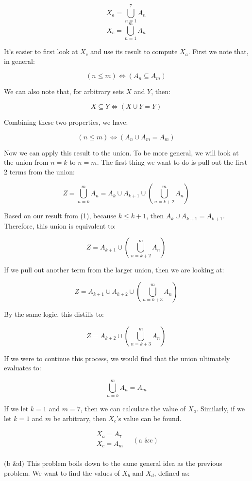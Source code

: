 \documentclass{article}
\newcommand{\subproblem}[1]{$\boxed{\text{(#1)}}$}
\newcommand{\subsolution}[2]{\boxed{#2\quad(\text{#1})}}
\begin{document}
\begin{multicols*}{2}
\[
X_a=\bigcup\limits_{n=1}^7 A_n
\] \[
X_c=\bigcup\limits_{n=1}^m A_n
\]

It's easier to first look at $X_c$ and use its result to compute
$X_a$. First we note that, in general:

\[
(n \le m)\Leftrightarrow(A_n\subseteq A_m)
\]

We can also note that, for arbitrary sets $X$ and $Y$, then:

\[
X\subseteq Y \Leftrightarrow (X\cup Y=Y)
\]

Combining these two properties, we have:

\[\tag{1}
(n\le m)\Leftrightarrow(A_n\cup A_m=A_m)
\]

Now we can apply this result to the union. To be more general, we will
look at the union from $n=k$ to $n=m$. The first thing we want to do
is pull out the first 2 terms from the union:

\[
Z = \bigcup\limits_{n=k}^m A_n = A_k\cup A_{k+1}\cup\left(\bigcup\limits_{n=k+2}^m A_n\right)
\]

Based on our result from (1), because $k\le{}k+1$, then
$A_k\cup{}A_{k+1}=A_{k+1}$. Therefore, this union is equivalent to:

\[
Z = A_{k+1}\cup\left(\bigcup\limits_{n=k+2}^m A_n\right)
\]

If we pull out another term from the larger union, then we are looking
at:

\[
Z = A_{k+1}\cup{}A_{k+2}\cup\left(\bigcup\limits_{n=k+3}^m A_n\right)
\]

By the same logic, this distills to:

\[
Z = A_{k+2}\cup\left(\bigcup\limits_{n=k+3}^m A_n\right)
\]

If we were to continue this process, we would find that the union
ultimately evaluates to:

\[
\bigcup\limits_{n=k}^m A_n = A_m
\]

If we let $k=1$ and $m=7$, then we can calculate the value of
$X_a$. Similarly, if we let $k=1$ and $m$ be arbitrary, then $X_c$'s
value can be found.

\[
\subsolution{a \& c}{\begin{array}{l}
X_a=A_7 \\
X_c=A_m \\
\end{array}}
\]

%
\subproblem{b \& d} This problem boils down to the same general idea
as the previous problem. We want to find the values of $X_b$ and
$X_d$, defined as:


\end{multicols*}
\end{document}
